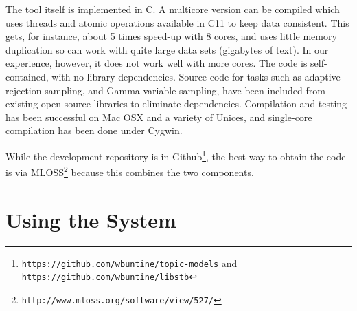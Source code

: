 \documentclass[twoside,11pt]{article}
\begin{document}
The tool itself is implemented in C.  A multicore version
can be compiled which uses threads and atomic operations available in C11
to keep data consistent. This gets, for instance, about 5 times speed-up
with 8 cores, and uses little memory duplication so can work with
quite large data sets (gigabytes of text).
In our experience, however, it does not work well with more cores.
The code is self-contained, with no library dependencies.
Source code for tasks such as
adaptive rejection sampling, and Gamma variable sampling,
have been included from existing open source libraries
to eliminate dependencies.
Compilation and testing has been successful on Mac OSX and a variety of Unices,
and single-core compilation has been done under Cygwin.

While the development repository is in Github\footnote{{\tt https://github.com/wbuntine/topic-models} and {\tt https://github.com/wbuntine/libstb}},
the best way to obtain the code is via MLOSS\footnote{\tt http://www.mloss.org/software/view/527/} because this combines the two components.

\section{Using the System}
\end{document}
